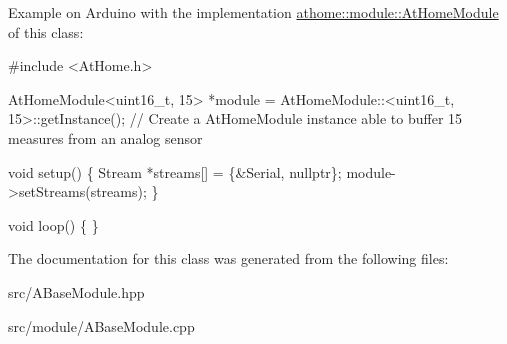 Example on Arduino with the implementation \mbox{\hyperlink{classathome_1_1module_1_1_at_home_module}{athome\+::module\+::\+At\+Home\+Module}} of this class\+:


\begin{DoxyCode}
\textcolor{preprocessor}{#include <AtHome.h>}

AtHomeModule<uint16\_t, 15> *module = AtHomeModule::<uint16\_t, 15>::getInstance(); \textcolor{comment}{// Create a AtHomeModule
       instance able to buffer 15 measures from an analog sensor}

\textcolor{keywordtype}{void} setup() \{
  Stream *streams[] = \{&Serial, \textcolor{keyword}{nullptr}\};
  module->setStreams(streams);
\}

\textcolor{keywordtype}{void} loop() \{
\}
\end{DoxyCode}
 

The documentation for this class was generated from the following files\+:\begin{DoxyCompactItemize}
\item 
src/A\+Base\+Module.\+hpp\item 
src/module/A\+Base\+Module.\+cpp\end{DoxyCompactItemize}
